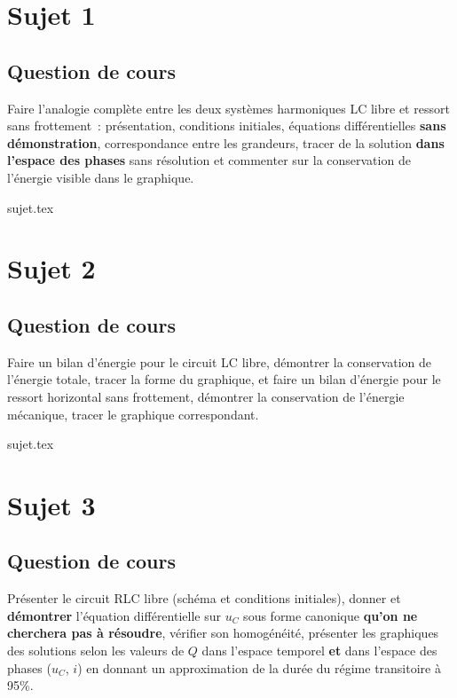 \documentclass[a4paper, 11pt]{book}
\begin{document}
\resetQ
\newpage

\chapter{Sujet 1}

\section{Question de cours}

Faire l'analogie complète entre les deux systèmes harmoniques LC libre et
ressort sans frottement~: présentation, conditions initiales, équations
différentielles \textbf{sans démonstration}, correspondance entre les grandeurs,
tracer de la solution \textbf{dans l'espace des phases} sans résolution et
commenter sur la conservation de l'énergie visible dans le graphique.

{sujet.tex}

\resetQ
\newpage

\chapter{Sujet 2}
\section{Question de cours}

Faire un bilan d'énergie pour le circuit LC libre, démontrer la conservation de
l'énergie totale, tracer la forme du graphique, et faire un bilan d'énergie pour
le ressort horizontal sans frottement, démontrer la conservation de l'énergie
mécanique, tracer le graphique correspondant.

{sujet.tex}

\resetQ
\newpage

\chapter{Sujet 3}
\section{Question de cours}

Présenter le circuit RLC libre (schéma et conditions initiales), donner et
\textbf{démontrer} l'équation différentielle sur $u_C$ sous forme canonique
\textbf{qu'on ne cherchera pas à résoudre}, vérifier son homogénéité, présenter
les graphiques des solutions selon les valeurs de $Q$ dans l'espace temporel
\textbf{et} dans l'espace des phases ($u_C$, $i$) en donnant un approximation de
la durée du régime transitoire à 95\%.
\end{document}
